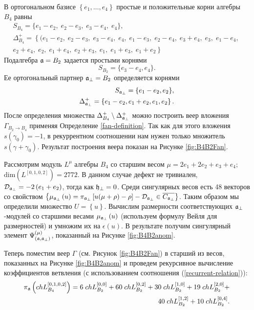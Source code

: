В ортогональном базисе $\left\{e_1,\dots,e_4\right\}$ простые и положительные корни алгебры $B_4$ равны
\begin{eqnarray*}
  \label{eq:19}
  S_{B_4}= \{e_1 - e_2,\; e_2 - e_3,\; e_3 - e_4,\; e_4\},\\[2mm]
 \Delta^+_{B_4}=\left\{ (e_1 - e_2,\; e_2 - e_3,\; e_3 - e_4,\; e_4,\; e_1 - e_3,\; e_2 - e_4,\; e_3 + e_4,\; e_3,\; e_1 - e_4,\;\right.\\
 \left. e_2 + e_4,\; e_2,\; e_1 + e_4,\; e_2 + e_3,\; e_1,\; e_1 + e_3,\; e_1 + e_2\right\}
\end{eqnarray*}
Подалгебра  $\mathfrak{a}=B_2$ задается простыми корнями
\begin{equation*}
  \label{eq:155}
 S_{B_2}=\{e_3-e_4,e_4\}.
\end{equation*}
Ее ортогональный партнер $\mathfrak{a}_{\perp}=B_2$ определяется корнями
\begin{eqnarray*}
  \label{eq:27}
  S_{\mathfrak{a}_{\perp}}=\{e_1-e_2,e_2\},\\
 \Delta^{+}_{\mathfrak{a}_{\perp}}= \left\{e_1-e_2,e_1+e_2,e_1,e_2\right\}.
\end{eqnarray*}
После определения множества $\Delta^+_{B_4} \setminus  \Delta^{+}_{\mathfrak{a}_{\perp}}$ можно построить веер вложения $\Gamma_{B_2 \to B_4}$ применяя Определение \ref{fan-definition}. Так как для этого вложения $s\left( \gamma_0\right)=-1$, в рекуррентном соотношении нам нужен только множитель $s\left(\gamma + \gamma_0\right)$. Результат построения веера показан на Рисунке \ref{fig:B4B2Fan}.

Рассмотрим модуль $L^{\mu}$ алгебры  $B_4$ со старшим весом $\mu=2e_1 + 2 e_2 + e_3 + e_4$; \,
$\mathrm{dim}(L^{\left[0,1,0,2\right]})=2772$.
В данном случае дефект не тривиален, $\mathcal{D}_{\mathfrak{a}_{\perp }}=-2\left( e_1 + e_2 \right)$, тогда как $\mathfrak{h}_{\bot}=0$. Среди сингулярных весов есть 
48 векторов со свойством $\left\{ \mu _{\mathfrak{a}_{\perp}}\left( u\right) =\pi _{\mathfrak{a}_{\perp }}\left[ u(\mu +\rho)-\rho \right] -\mathcal{D}_{\mathfrak{a}_{\perp}}\in \overline{C_{\mathfrak{a}_{\perp}}}\right\} $.
Таким образом мы определили множество $U=\left\{ u \right\}$. Вычислим размерности соответствующих  $\mathfrak{a}_{\perp}$-модулей со старшими весами $\mu_{\mathfrak{a}_{\perp}}\left( u\right)$ (используем формулу Вейля для размерностей) и умножим их на $\epsilon\left( u \right)$. В результате получим сингулярный элемент
$\Psi ^{\left( \mu \right) }_{\left(  \mathfrak{a}, \mathfrak{a}_{\perp} \right)}$, показанный на Рисунке \ref{fig:B4B2anom}.

Теперь поместим веер  $\Gamma$ (см. Рисунок \ref{fig:B4B2Fan}) в старший из весов, показанных на Рисунке \ref{fig:B4B2anom} и проведем рекурсивное вычисление коэффициентов ветвления (с использованием соотношения (\ref{recurrent-relation})):
\begin{eqnarray*}
  \label{eq:24}
  \pi_{\mathfrak{a}} \left(ch L^{\left[0,1,0,2\right]}_{B_4}\right) = 6 \; ch L^{\left[0,0\right]}_{B_2}+ 60
  \; ch L_{B_2}^{\left[0,2\right]}+ 30 \; ch L_{B_2}^{\left[1,0\right]}+ 19 \; ch L_{B_2}^{\left[2,0\right]}+\\
  40 \; ch L_{B_2}^{\left[1,2\right]}+ 10 \; ch L_{B_2}^{\left[0,4\right]}.
\end{eqnarray*}

